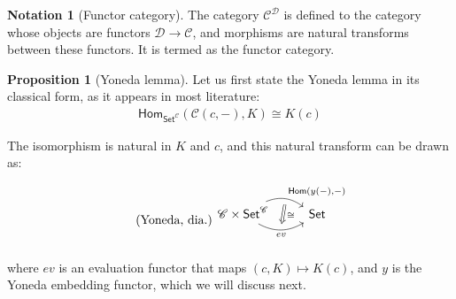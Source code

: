 \documentclass[10pt]{amsart}
\newcommand{\8}{\ensuremath{\infty}}
\newcommand{\0}{\ensuremath{\overset{\rightarrow}{0}}}
\newcommand{\1}{\ensuremath{\mathbf{1}}}
\newcommand{\C}{\ensuremath{\mathscr{C}}}
\newcommand{\D}{\ensuremath{\mathscr{D}}}
\newcommand{\Set}{\ensuremath{\mathsf{Set}}}
\newcommand{\Hom}{\ensuremath{\mathsf{Hom}}}
\theoremstyle{definition}
\newtheorem{notation}[definition]{Notation}
\newtheorem{proposition}[definition]{Proposition}
\numberwithin{definition}{subsection}
\numberwithin{definition}{section}
\begin{document}
\begin{notation}[Functor category]
  The category $\C^\D$ is defined to the category whose objects are functors $\D \rightarrow \C$, and morphisms are natural transforms between these functors. It is termed as the functor category.
\end{notation}

\begin{proposition}[Yoneda lemma]
  Let us first state the Yoneda lemma in its classical form, as it appears in most literature:
  \begin{align}\label{eqn:yoneda}\tag{Yoneda, stm.}
    \Hom_{\Set^\C}(\C(c, -), K) \cong K(c)
  \end{align}

  The isomorphism is natural in $K$ and $c$, and this natural transform can be drawn as:

  \begin{equation}\label{dia:yoneda}\tag{Yoneda, dia.}
    \begin{tikzcd}
      \C \times \Set^\C \arrow[r, bend left, "{\Hom(y(-), -)}", ""{name=U, below}] \arrow[r, bend right, "ev"', ""{name=D, above}] & \Set \arrow[Rightarrow, from=U, to=D, "\cong" near start] \\
    \end{tikzcd}
  \end{equation}

  where $ev$ is an evaluation functor that maps $(c, K) \mapsto K(c)$, and $y$ is the Yoneda embedding functor, which we will discuss next.
\end{proposition}
\end{document}

